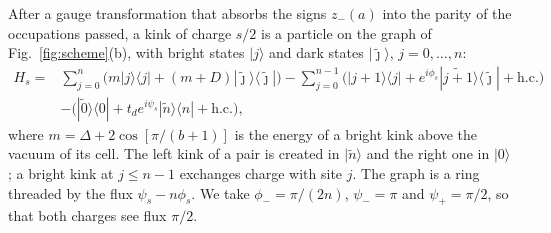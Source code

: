 \documentclass[11pt]{article}
\newcommand{\ket}[1]{|#1\rangle}
\newcommand{\bra}[1]{\langle #1|}
\newcommand{\hc}{\mathrm{h.c.}}
\begin{document}
After a gauge transformation that absorbs the signs $z_-(a)$ into the parity of the occupations passed, a kink of charge $s/2$ is a particle on the graph of Fig.~\ref{fig:scheme}(b), with bright states $\ket j$ and dark states $\ket{\tilde\jmath}$, $j=0,\dots,n$:
\begin{align}
H_s={}&\sum_{j=0}^n\Big(m\ket j\bra j+(m+D)\ket{\tilde\jmath}\bra{\tilde\jmath}\Big)
-\sum_{j=0}^{n-1}\Big(\ket{j+1}\bra j+e^{i\phi_s}\ket{\widetilde{j+1}}\bra{\tilde\jmath}+\hc\Big)\nonumber\\
&-\Big(\ket{\tilde0}\bra0+t_de^{i\psi_s}\ket{\tilde n}\bra n+\hc\Big),
\label{eq:Hs}
\end{align}
where $m=\Delta+2\cos[\pi/(b+1)]$ is the energy of a bright kink above the vacuum of its cell. The left kink of a pair is created in $\ket{\tilde n}$ and the right one in $\ket0$; a bright kink at $j\le n-1$ exchanges charge with site $j$. The graph is a ring threaded by the flux $\psi_s-n\phi_s$. We take $\phi_-=\pi/(2n)$, $\psi_-=\pi$ and $\psi_+=\pi/2$, so that both charges see flux $\pi/2$.
\end{document}
